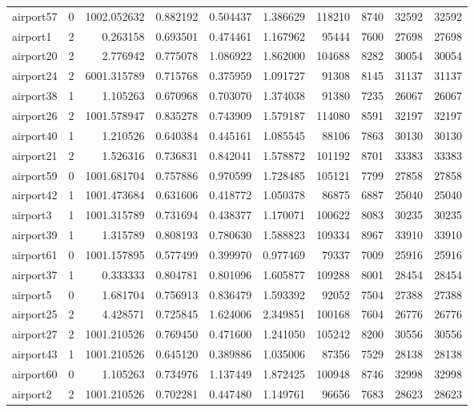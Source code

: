 \documentclass[../../../thesis.tex]{subfiles}
\begin{document}
\begin{longtable}{|l|r|r|r|r|r|r|r|r|r|}
airport57 & 0 & 1002.052632 & 0.882192 & 0.504437 & 1.386629 & 118210 & 8740 & 32592 & 32592 \\
airport1 & 2 & 0.263158 & 0.693501 & 0.474461 & 1.167962 & 95444 & 7600 & 27698 & 27698 \\
airport20 & 2 & 2.776942 & 0.775078 & 1.086922 & 1.862000 & 104688 & 8282 & 30054 & 30054 \\
airport24 & 2 & 6001.315789 & 0.715768 & 0.375959 & 1.091727 & 91308 & 8145 & 31137 & 31137 \\
airport38 & 1 & 1.105263 & 0.670968 & 0.703070 & 1.374038 & 91380 & 7235 & 26067 & 26067 \\
airport26 & 2 & 1001.578947 & 0.835278 & 0.743909 & 1.579187 & 114080 & 8591 & 32197 & 32197 \\
airport40 & 1 & 1.210526 & 0.640384 & 0.445161 & 1.085545 & 88106 & 7863 & 30130 & 30130 \\
airport21 & 2 & 1.526316 & 0.736831 & 0.842041 & 1.578872 & 101192 & 8701 & 33383 & 33383 \\
airport59 & 0 & 1001.681704 & 0.757886 & 0.970599 & 1.728485 & 105121 & 7799 & 27858 & 27858 \\
airport42 & 1 & 1001.473684 & 0.631606 & 0.418772 & 1.050378 & 86875 & 6887 & 25040 & 25040 \\
airport3 & 1 & 1001.315789 & 0.731694 & 0.438377 & 1.170071 & 100622 & 8083 & 30235 & 30235 \\
airport39 & 1 & 1.315789 & 0.808193 & 0.780630 & 1.588823 & 109334 & 8967 & 33910 & 33910 \\
airport61 & 0 & 1001.157895 & 0.577499 & 0.399970 & 0.977469 & 79337 & 7009 & 25916 & 25916 \\
airport37 & 1 & 0.333333 & 0.804781 & 0.801096 & 1.605877 & 109288 & 8001 & 28454 & 28454 \\
airport5 & 0 & 1.681704 & 0.756913 & 0.836479 & 1.593392 & 92052 & 7504 & 27388 & 27388 \\
airport25 & 2 & 4.428571 & 0.725845 & 1.624006 & 2.349851 & 100168 & 7604 & 26776 & 26776 \\
airport27 & 2 & 1001.210526 & 0.769450 & 0.471600 & 1.241050 & 105242 & 8200 & 30556 & 30556 \\
airport43 & 1 & 1001.210526 & 0.645120 & 0.389886 & 1.035006 & 87356 & 7529 & 28138 & 28138 \\
airport60 & 0 & 1.105263 & 0.734976 & 1.137449 & 1.872425 & 100948 & 8746 & 32998 & 32998 \\
airport2 & 2 & 1001.210526 & 0.702281 & 0.447480 & 1.149761 & 96656 & 7683 & 28623 & 28623 \\

\end{longtable}
\end{document}
